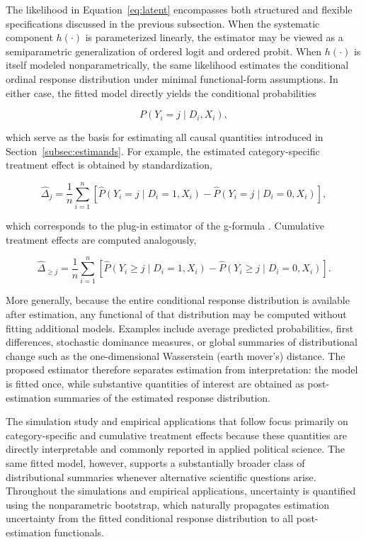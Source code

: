 \documentclass{article}
\begin{document}
The likelihood in Equation~\eqref{eq:latent} encompasses both structured and flexible specifications discussed in the previous subsection. When the systematic component $h(\cdot)$ is parameterized linearly, the estimator may be viewed as a semiparametric generalization of ordered logit and ordered probit. When $h(\cdot)$ is itself modeled nonparametrically, the same likelihood estimates the conditional ordinal response distribution under minimal functional-form assumptions. In either case, the fitted model directly yields the conditional probabilities

\[
P(Y_i=j\mid D_i,X_i),
\]

which serve as the basis for estimating all causal quantities introduced in Section~\ref{subsec:estimands}. For example, the estimated category-specific treatment effect is obtained by standardization,

\[
\widehat{\Delta}_j = 
\frac{1}{n}
\sum_{i=1}^{n} \left[ \widehat{P}(Y_i=j\mid D_i=1,X_i) - \widehat{P}(Y_i=j\mid D_i=0,X_i)
\right],
\]

which corresponds to the plug-in estimator of the g-formula \citep{Robins1986a}. Cumulative treatment effects are computed analogously,

\[
\widehat{\Delta}_{\ge j} = 
\frac{1}{n} \sum_{i=1}^{n} \left[ \widehat{P}(Y_i\ge j\mid D_i=1,X_i) - \widehat{P}(Y_i\ge j\mid D_i=0,X_i) \right].
\]

More generally, because the entire conditional response distribution is available after estimation, any functional of that distribution may be computed without fitting additional models. Examples include average predicted probabilities, first differences, stochastic dominance measures, or global summaries of distributional change such as the one-dimensional Wasserstein (earth mover’s) distance. The proposed estimator therefore separates estimation from interpretation: the model is fitted once, while substantive quantities of interest are obtained as post-estimation summaries of the estimated response distribution.

The simulation study and empirical applications that follow focus primarily on category-specific and cumulative treatment effects because these quantities are directly interpretable and commonly reported in applied political science. The same fitted model, however, supports a substantially broader class of distributional summaries whenever alternative scientific questions arise. Throughout the simulations and empirical applications, uncertainty is quantified using the nonparametric bootstrap, which naturally propagates estimation uncertainty from the fitted conditional response distribution to all post-estimation functionals.
\end{document}
